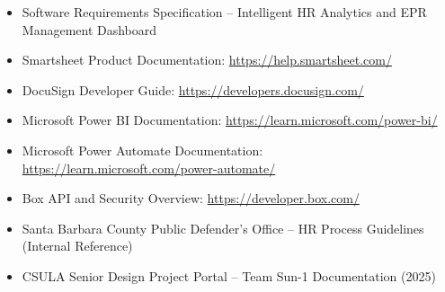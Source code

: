 \documentclass[12pt]{article}
\def\&{ and }%
\begin{document}
\begin{itemize}[nosep]
  \item Software Requirements Specification – Intelligent HR Analytics \& EPR Management Dashboard  
  \item Smartsheet Product Documentation: \url{https://help.smartsheet.com/}  
  \item DocuSign Developer Guide: \url{https://developers.docusign.com/}  
  \item Microsoft Power BI Documentation: \url{https://learn.microsoft.com/power-bi/}  
  \item Microsoft Power Automate Documentation: \url{https://learn.microsoft.com/power-automate/}  
  \item Box API and Security Overview: \url{https://developer.box.com/}  
  \item Santa Barbara County Public Defender’s Office – HR Process Guidelines (Internal Reference)  
  \item CSULA Senior Design Project Portal – Team Sun-1 Documentation (2025)
\end{itemize}
\end{document}
